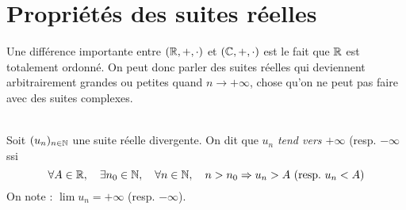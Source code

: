 \section{Propriétés des suites réelles}
    Une différence importante entre \((\mathbb{R}, +, \cdot)\) et \((\mathbb{C}, +, \cdot)\) est le fait que \(\mathbb{R}\) est totalement ordonné.
    On peut donc parler des suites réelles qui deviennent arbitrairement grandes ou petites quand \(n\to+\infty\), chose qu'on ne peut pas faire avec des suites complexes.

    \begin{definition}
        \ \\
        Soit \((u_n)_{n\in\mathbb{N}}\) une suite réelle divergente. On dit que \(u_n\) \emph{tend vers \(+\infty\)} (resp. \(-\infty\)  ssi 
        \[
            \forall A \in \mathbb{R}, \quad \exists n_0 \in \mathbb{N}, \quad \forall n \in \mathbb{N}, \quad n > n_0 \Rightarrow u_n > A\ \mathrm{(resp.}\ u_n < A)     
        \]  
        On note :  \(\lim u_n = +\infty\) (resp. \(-\infty\)).
    \end{definition}

    \begin{definition}\ \\
        
    \end{definition}